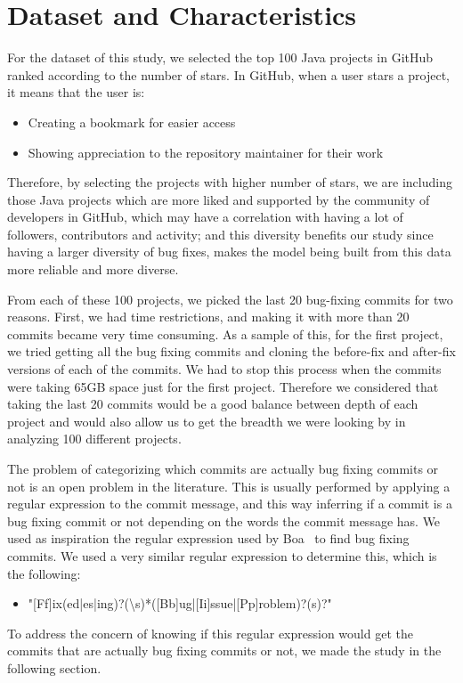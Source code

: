 
\section{Dataset and Characteristics}
For the dataset of this study, we selected the top 100 Java projects in GitHub ranked according to the number of stars. In GitHub, when a user stars a project, it means that the user is:
\begin{itemize}
  \item Creating a bookmark for easier access
  \item Showing appreciation to the repository maintainer for their work
\end{itemize}

Therefore, by selecting the projects with higher number of stars, we are including those Java projects which are more liked and supported by the community of developers in GitHub, which may have a correlation with having a lot of followers, contributors and activity; and this diversity benefits our study since having a larger diversity of bug fixes, makes the model being built from this data more reliable and more diverse.

From each of these 100 projects, we picked the last 20 bug-fixing commits for two reasons. First, we had time restrictions, and making it with more than 20 commits became very time consuming. As a sample of this, for the first project, we tried getting all the bug fixing commits and cloning the before-fix and after-fix versions of each of the commits. We had to stop this process when the commits were taking 65GB space just for the first project. Therefore we considered that taking the last 20 commits would be a good balance between depth of each project and would also allow us to get the breadth we were looking by in analyzing 100 different projects. 

The problem of categorizing which commits are actually bug fixing commits or not is an open problem in the literature. This is usually performed by applying a regular expression to the commit message, and this way inferring if a commit is a bug fixing commit or not depending on the words the commit message has. We used as inspiration the regular expression used by Boa~\cite{Dyer2013} to find bug fixing commits. We used a very similar regular expression to determine this, which is the following:
\begin{itemize}
  \item "[Ff]ix(ed|es|ing)?(\textbackslash s)*([Bb]ug|[Ii]ssue|[Pp]roblem)?(s)?"
\end{itemize}

To address the concern of knowing if this regular expression would get the commits that are actually bug fixing commits or not, we made the study in the following section.


